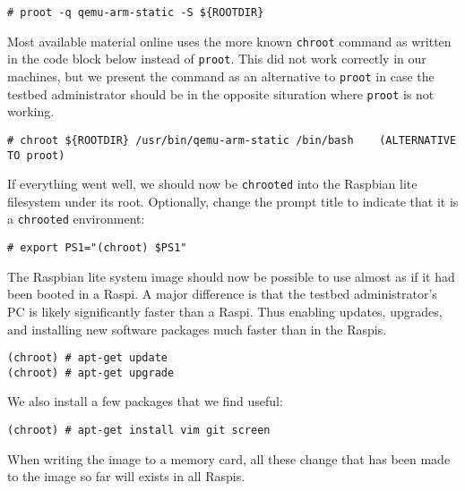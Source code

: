 \begin{lstlisting}[]
# proot -q qemu-arm-static -S ${ROOTDIR}
\end{lstlisting}
\FloatBarrier
\vspace{-5mm}

Most available material online uses the more known \texttt{chroot} command as
written in the code block below instead of \texttt{proot}. This did not work
correctly in our machines, but we present the command as an alternative to
\texttt{proot} in case the testbed administrator should be in the opposite
situration where \texttt{proot} is not working.

\begin{lstlisting}[]
# chroot ${ROOTDIR} /usr/bin/qemu-arm-static /bin/bash    (ALTERNATIVE TO proot)
\end{lstlisting}
\FloatBarrier
\vspace{-5mm}

If everything went well, we should now be \texttt{chrooted} into the Raspbian lite
filesystem under its root. Optionally, change the prompt title to indicate that it
is a \texttt{chrooted} environment:

\begin{lstlisting}[]
# export PS1="(chroot) $PS1"
\end{lstlisting}
\FloatBarrier
\vspace{-5mm}

The Raspbian lite system image should now be possible to use almost as if it
had been booted in a \ac{Raspi}.
A major difference is that the testbed administrator's \ac{PC} is likely
significantly faster than a \ac{Raspi}.
Thus enabling updates, upgrades, and installing new software packages much
faster than in the \ac{Raspi}s.

\begin{lstlisting}[]
(chroot) # apt-get update
(chroot) # apt-get upgrade
\end{lstlisting}
\FloatBarrier
\vspace{-5mm}

We also install a few packages that we find useful:
\begin{lstlisting}[]
(chroot) # apt-get install vim git screen
\end{lstlisting}
\FloatBarrier
\vspace{-5mm}

When writing the image to a memory card, all these change that has been made
to the image so far will exists in all \ac{Raspi}s.
